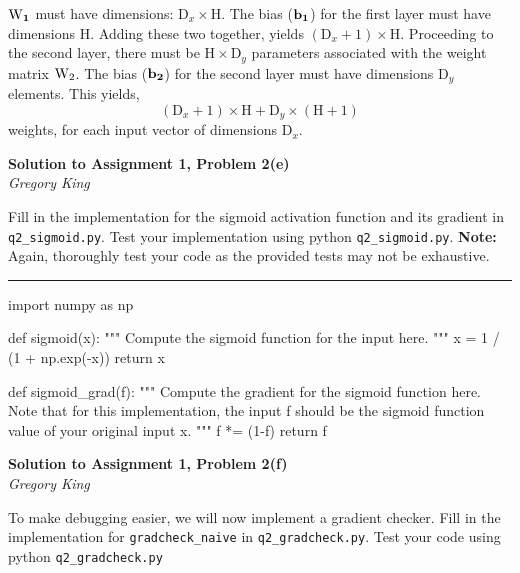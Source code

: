 \documentclass[letter,12pt]{article}
\newcommand{\myhwtitle}[3]
{\begin{center}
{\large {\bf Solution to Assignment {#1}, Problem {#2}}}\\
\medskip 
{\it {#3}} %
\end{center}}
\begin{document}
\noindent $\bf{\textrm{W}}_{1}$ must have dimensions:  $\textrm{D}_{x}\times\textrm{H}$. The bias ($\bf{b}_{1}$) for the first layer must have
dimensions $\textrm{H}$. Adding these two together, yields $(\textrm{D}_{x} + 1)\times\textrm{H}$. Proceeding to the second layer,
there must be $\textrm{H}\times\textrm{D}_{y}$ parameters associated with the weight matrix ${\bf\textrm{W}}_{2}$. The bias ($\bf{b}_{2}$)
for the second layer must have dimensions $\textrm{D}_{y}$ elements. This yields, 
\begin{equation}
(\textrm{D}_{x} + 1)\times\textrm{H} + \textrm{D}_{y}\times(\textrm{H}+1)
\end{equation}
weights, for each input vector of dimensions $\textrm{D}_{x}$.
\clearpage
\myhwtitle{1}{2(e)}{Gregory King}
\bigskip
\noindent Fill in the implementation for the sigmoid activation function and its gradient in  \texttt{q2\_sigmoid.py}.
Test your implementation using python \texttt{q2\_sigmoid.py}. \textbf{Note:} Again, thoroughly test your code as the provided
tests may not be exhaustive.\vspace{5mm}

\noindent\rule{\textwidth}{0.4pt}
\begin{python}
import numpy as np

def sigmoid(x):
    """
    Compute the sigmoid function for the input here.
    """
    x = 1 / (1 + np.exp(-x))
    return x

def sigmoid_grad(f):
    """
    Compute the gradient for the sigmoid function here. Note that
    for this implementation, the input f should be the sigmoid
    function value of your original input x. 
    """
    f *= (1-f)
    return f
\end{python}
\clearpage
\myhwtitle{1}{2(f)}{Gregory King}
\bigskip
\noindent To make debugging easier, we will now implement a gradient checker. Fill in the implementation
for \texttt{gradcheck\_naive} in \texttt{q2\_gradcheck.py}. Test your code using python \texttt{q2\_gradcheck.py}\vspace{5mm}
\end{document}
